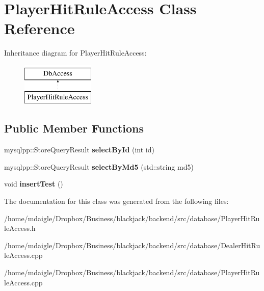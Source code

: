 \hypertarget{classPlayerHitRuleAccess}{
\section{\-Player\-Hit\-Rule\-Access \-Class \-Reference}
\label{classPlayerHitRuleAccess}
}
\-Inheritance diagram for \-Player\-Hit\-Rule\-Access\-:\begin{figure}[H]
\begin{center}
\leavevmode
\includegraphics[height=2.000000cm]{classPlayerHitRuleAccess}
\end{center}
\end{figure}
\subsection*{\-Public \-Member \-Functions}
\begin{DoxyCompactItemize}
\item 
\hypertarget{classPlayerHitRuleAccess_ac53503fea0430e2c337f95dcd3345673}{
mysqlpp\-::\-Store\-Query\-Result {\bfseries select\-By\-Id} (int id)}
\label{classPlayerHitRuleAccess_ac53503fea0430e2c337f95dcd3345673}

\item 
\hypertarget{classPlayerHitRuleAccess_a30789188c00e0a353352b50360954c0b}{
mysqlpp\-::\-Store\-Query\-Result {\bfseries select\-By\-Md5} (std\-::string md5)}
\label{classPlayerHitRuleAccess_a30789188c00e0a353352b50360954c0b}

\item 
\hypertarget{classPlayerHitRuleAccess_aec17c23694f6fd7e220f666e35cadebe}{
void {\bfseries insert\-Test} ()}
\label{classPlayerHitRuleAccess_aec17c23694f6fd7e220f666e35cadebe}

\end{DoxyCompactItemize}


\-The documentation for this class was generated from the following files\-:\begin{DoxyCompactItemize}
\item 
/home/mdaigle/\-Dropbox/\-Business/blackjack/backend/src/database/\-Player\-Hit\-Rule\-Access.\-h\item 
/home/mdaigle/\-Dropbox/\-Business/blackjack/backend/src/database/\-Dealer\-Hit\-Rule\-Access.\-cpp\item 
/home/mdaigle/\-Dropbox/\-Business/blackjack/backend/src/database/\-Player\-Hit\-Rule\-Access.\-cpp\end{DoxyCompactItemize}
